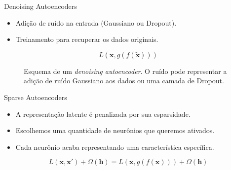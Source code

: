 \documentclass[dvipsnames]{beamer}
\begin{document}
\begin{frame}{Denoising Autoencoders}

	\begin{itemize}
		\item Adição de ruído na entrada (Gaussiano ou Dropout).
		\item Treinamento para recuperar os dados originais.
	\end{itemize}

	$$L(\boldsymbol{x}, g(f(\tilde{\boldsymbol{x}})))$$

	\begin{figure}

		\centering


		\caption{
			\justifying
			Esquema de um \emph{denoising autoencoder}. O ruído pode representar a adição de ruído Gaussiano aos dados ou uma camada de Dropout.
		}

	\end{figure}

\end{frame}

\begin{frame}{Sparse Autoencoders}

	\begin{itemize}
		\item A representação latente é penalizada por sua esparsidade.
		\item Escolhemos uma quantidade de neurônios que queremos ativados.
		\item Cada neurônio acaba representando uma característica específica.
	\end{itemize}

	$$L(\boldsymbol{x}, \boldsymbol{x'}) + \Omega(\boldsymbol{h}) = L(\boldsymbol{x}, g(f(\boldsymbol{x}))) + \Omega(\boldsymbol{h})$$

\end{frame}
\end{document}
